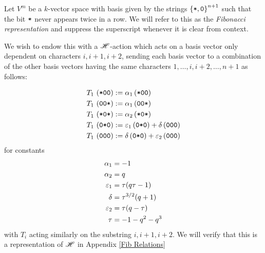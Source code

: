 \documentclass{amsart}
\begin{document}
  \begin{definition}
  Let $V^m$ be a $k$-vector space with basis given by the strings $\left\{ \texttt{*},\texttt{0} \right\}^{n+1}$ such that the bit $\texttt{*}$ never appears twice in a row. 
  We will refer to this as the \emph{Fibonacci representation} and suppress the superscript whenever it is clear from context.

  We wish to endow this with a $\mathscr{H}$-action which acts on a basis vector only dependent on characters $i,i+1,i+2$, sending each basis vector to a combination of the other basis vectors having the same characters $1,\dots,i,i+2,\dots,n+1$ as follows:

  \begin{equation} 
    \begin{split}
      T_1 \, \left( \texttt{*}\texttt{0}\texttt{0} \right) &:= \alpha_1\left( \texttt{*}\texttt{0}\texttt{0} \right)\\
      T_1 \, \left( \texttt{0}\texttt{0}\texttt{*} \right) &:= \alpha_1\left( \texttt{0}\texttt{0}\texttt{*} \right)\\
      T_1 \, \left( \texttt{*}\texttt{0}\texttt{*} \right) &:= \alpha_2\left( \texttt{*}\texttt{0}\texttt{*} \right)\\
      T_1 \, \left( \texttt{0}\texttt{*}\texttt{0} \right) &:= \varepsilon_1\left( \texttt{0}\texttt{*}\texttt{0} \right) + \delta\left( \texttt{0}\texttt{0}\texttt{0} \right)\\
      T_1 \, \left( \texttt{0}\texttt{0}\texttt{0} \right) &:= \delta\left( \texttt{0}\texttt{*}\texttt{0} \right) + \varepsilon_2\left( \texttt{0}\texttt{0}\texttt{0} \right)
  \end{split} \label{Fib Action} 
  \end{equation}
  for constants
  \begin{equation}
    \begin{split}
    \alpha_1 &= -1\\
    \alpha_2 &= q\\
    \varepsilon_1 &= \tau(q\tau - 1)\\
    \delta &= \tau^{3/2}(q + 1)\\
    \varepsilon_2 &= \tau(q-\tau)\\
    \tau &= -1-q^2-q^3
  \end{split} \label{Fib Constants} 
  \end{equation}
  with $T_i$ acting similarly on the substring $i,i+1,i+2$.
  We will verify that this is a representation of $\mathscr{H}$ in Appendix \ref{Fib Relations}
  \end{definition}
\end{document}
